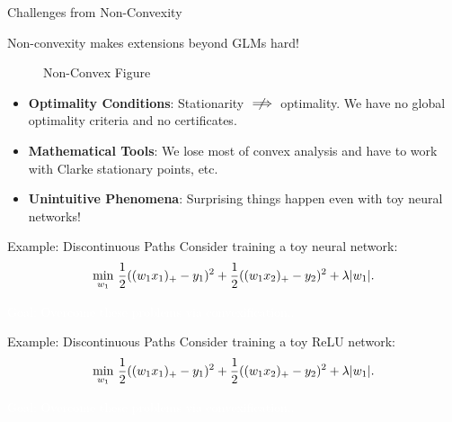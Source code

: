 \documentclass[usenames,dvipsnames,mathserif,notheorems]{beamer}
\newcommand{\bad}[1]{\textcolor{bad}{#1}}
\def\showtikz{}
\begin{document}
\begin{frame}{Challenges from Non-Convexity}
	\begin{center}
		\Large
		Non-convexity makes extensions beyond GLMs \bad{hard}!
	\end{center}

	\begin{figure}[]
		\centering
		\ifdefined\showtikz
			
		\else
			\Huge Non-Convex Figure
		\fi
	\end{figure}

	\pause
	\begin{itemize}
		\item \textbf{Optimality Conditions}: Stationarity \( \centernot \implies \) optimality.
		      We have no global optimality criteria and no certificates.

		      \vspace{1em}

		      \pause
		\item \textbf{Mathematical Tools}: We lose most of convex analysis
		      and have to work with Clarke stationary points, etc.
		      \vspace{1em}

		      \pause

		\item \textbf{Unintuitive Phenomena}: Surprising things happen even
		      with toy neural networks!

	\end{itemize}

\end{frame}

\begin{frame}{Example: Discontinuous Paths}
	Consider training a toy neural network:
	\[
		\min_{w_1} \, \frac 1 2 ((w_1 x_1)_+ - y_1)^2 + \frac 1 2 ((w_1 x_2)_+ - y_2)^2 + \lambda |w_1|.
	\]
	\pause

	\begin{center}
		
	\end{center}

	\begin{center}
		\Large
		\textcolor{white}{Goal: Overcome these problems via convexification..}
	\end{center}

\end{frame}

\begin{frame}{Example: Discontinuous Paths}
	Consider training a toy ReLU network:
	\[
		\min_{w_1} \, \frac 1 2 ((w_1 x_1)_+ - y_1)^2 + \frac 1 2 ((w_1 x_2)_+ - y_2)^2 + \lambda |w_1|.
	\]

	\begin{center}
		
	\end{center}

	\begin{center}
		\Large
		\textcolor{white}{Goal: Overcome these problems via convexification..}
	\end{center}

\end{frame}
\end{document}
